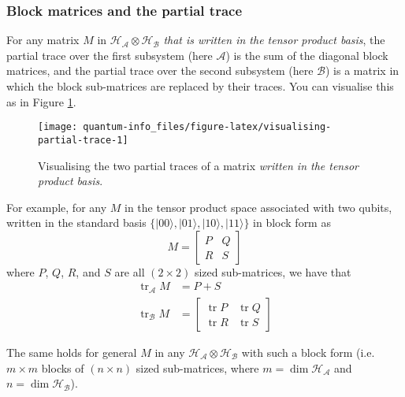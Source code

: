 \documentclass[fleqn]{article}
\begin{document}
\hypertarget{block-matrices-and-the-partial-trace}{%
\subsubsection{Block matrices and the partial trace}\label{block-matrices-and-the-partial-trace}}

For any matrix \(M\) in \(\mathcal{H}_{\mathcal{A}}\otimes\mathcal{H}_{\mathcal{B}}\) \emph{that is written in the tensor product basis}, the partial trace over the first subsystem (here \(\mathcal{A}\)) is the sum of the diagonal block matrices, and the partial trace over the second subsystem (here \(\mathcal{B}\)) is a matrix in which the block sub-matrices are replaced by their traces.
You can visualise this as in Figure \ref{fig:visualising-partial-trace}.



\begin{figure}[H]

{\centering \texttt{[image: quantum-info\_files/figure-latex/visualising-partial-trace-1]} 

}

\caption{Visualising the two partial traces of a matrix \emph{written in the tensor product basis}.}\label{fig:visualising-partial-trace}
\end{figure}

For example, for any \(M\) in the tensor product space associated with two qubits, written in the standard basis \(\{|00\rangle,|01\rangle,|10\rangle,|11\rangle\}\) in block form as
\[
  M =
  \left[
    \begin{array}{c|c}
      P & Q
    \\\hline
      R & S
    \end{array}
  \right]
\]
where \(P\), \(Q\), \(R\), and \(S\) are all \((2\times 2)\) sized sub-matrices, we have that
\[
  \begin{aligned}
    \operatorname{tr}_{\mathcal{A}} M
    &= P+S
  \\\operatorname{tr}_{\mathcal{B}} M
    &=
  \left[
    \begin{array}{c|c}
      \operatorname{tr}P & \operatorname{tr}Q
    \\\hline
      \operatorname{tr}R & \operatorname{tr}S
    \end{array}
  \right]
  \end{aligned}
\]

The same holds for general \(M\) in any \(\mathcal{H}_{\mathcal{A}}\otimes\mathcal{H}_{\mathcal{B}}\) with such a block form (i.e.~\(m\times m\) blocks of \((n\times n)\) sized sub-matrices, where \(m=\dim\mathcal{H}_{\mathcal{A}}\) and \(n=\dim\mathcal{H}_{\mathcal{B}}\)).
\end{document}
